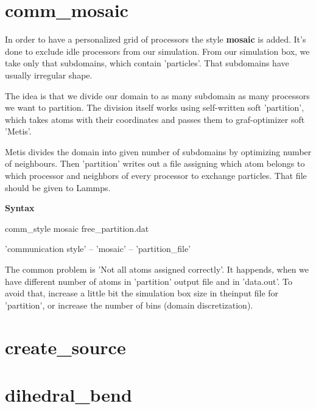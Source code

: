 \documentclass[a4paper,10pt]{scrreprt}
\begin{document}
\section{comm\_mosaic}
In order to have a personalized grid of processors the style \textbf{mosaic} is added. It's done to exclude idle processors from our simulation. From our simulation box, we take only that subdomains, which contain 'particles'. That subdomains have usually irregular shape.

The idea is that we divide our domain to as many subdomain as many processors we want to partition. The division itself works using self-written soft 'partition', which takes atoms with their coordinates and passes them to graf-optimizer soft 'Metis'.

Metis divides the domain into given number of subdomains by optimizing number of neighbours. Then 'partition' writes out a file assigning which atom belongs to which processor and neighbors of every processor to exchange particles. That file should be given to Lammps.

\textbf{Syntax}

comm\_style      mosaic free\_partition.dat

'communication style' -- 'mosaic' -- 'partition\_file'

The common problem is 'Not all atoms assigned correctly'. It happends, when we have different number of atoms in 'partition' output file and in 'data.out'. To avoid that, increase a little bit the simulation box size in theinput file for 'partition', or increase the number of bins (domain discretization).

\section{create\_source}

\section{dihedral\_bend}
\end{document}
